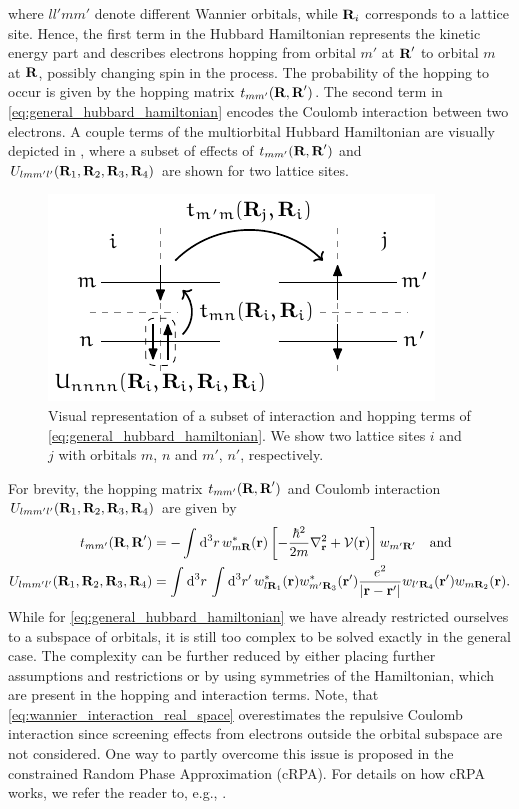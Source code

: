 \documentclass[../../main.tex]{subfiles}
\begin{document}
where $ll'mm'$ denote different Wannier orbitals, while $\textbf{R}_i$ corresponds to a lattice site. Hence, the first term in the Hubbard Hamiltonian represents the kinetic energy part and describes electrons hopping from orbital $m'$ at $\textbf{R}'$ to orbital $m$ at $\textbf{R}$, possibly changing spin in the process. The probability of the hopping to occur is given by the hopping matrix $t_{mm'}(\textbf{R},\textbf{R}')$. The second term in \eqref{eq:general_hubbard_hamiltonian} encodes the Coulomb interaction between two electrons. A couple terms of the multiorbital Hubbard Hamiltonian are visually depicted in , where a subset of effects of $t_{mm'}(\textbf{R},\textbf{R}')$ and $U_{lmm'l'}(\textbf{R}_1,\textbf{R}_2,\textbf{R}_3,\textbf{R}_4)$ are shown for two lattice sites. 
\begin{figure}[ht!]
	\centering
	\includegraphics[width=.45\textwidth]{../../Graphics/Diagrams/two_orbitals_two_sites_hopping/two_orbitals_two_sites_hopping.pdf}
	\caption{Visual representation of a subset of interaction and hopping terms of \eqref{eq:general_hubbard_hamiltonian}. We show two lattice sites $i$ and $j$ with orbitals $m$, $n$ and $m'$, $n'$, respectively.}
	\label{fig:two_orbitals_two_sites_hopping}
\end{figure}
For brevity, the hopping matrix $t_{mm'}(\textbf{R},\textbf{R}')$ and Coulomb interaction $U_{lmm'l'}(\textbf{R}_1,\textbf{R}_2,\textbf{R}_3,\textbf{R}_4)$ are given by
\begin{subequations}
\begin{align}
	t_{mm'}(\textbf{R},\textbf{R}')&=-\int_{}^{}\text{d}^3r\,w^*_{m\textbf{R}}(\textbf{r})\left [-\frac{\hbar^2}{2m}\nabla^2_{\textbf{r}}+\mathcal{V}(\textbf{r})\right ]w_{m'\textbf{R}'}\quad\text{and}\\
	U_{lmm'l'}(\textbf{R}_1,\textbf{R}_2,\textbf{R}_3,\textbf{R}_4)&=\int_{}^{}\text{d}^3r\,\int_{}^{}\text{d}^3r'\,w^*_{l\textbf{R}_1}(\textbf{r})w^*_{m'\textbf{R}_3}(\textbf{r}')\frac{e^2}{|\textbf{r}-\textbf{r}'|}w_{l'\textbf{R}_4}(\textbf{r}')w_{m\textbf{R}_2}(\textbf{r}).\label{eq:wannier_interaction_real_space}
\end{align}
\end{subequations}
While for \eqref{eq:general_hubbard_hamiltonian} we have already restricted ourselves to a subspace of orbitals, it is still too complex to be solved exactly in the general case. The complexity can be further reduced by either placing further assumptions and restrictions or by using symmetries of the Hamiltonian, which are present in the hopping and interaction terms. Note, that \eqref{eq:wannier_interaction_real_space} overestimates the repulsive Coulomb interaction since screening effects from electrons outside the orbital subspace are not considered. One way to partly overcome this issue is proposed in the constrained Random Phase Approximation (cRPA). For details on how cRPA works, we refer the reader to, e.g., \cite{Zhang2022}. 
\end{document}

